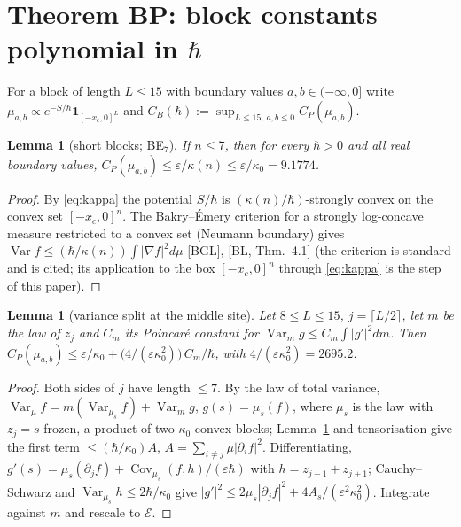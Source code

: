 \documentclass[11pt,a4paper]{article}
\newtheorem{lemma}[theorem]{Lemma}
\theoremstyle{definition}
\theoremstyle{remark}
\newcommand{\Var}{\operatorname{Var}}
\newcommand{\Cov}{\operatorname{Cov}}
\newcommand{\cE}{\mathcal{E}}
\newcommand{\xc}{x_c}
\begin{document}
\section{Theorem BP: block constants polynomial in \texorpdfstring{$\hbar$}{hbar}}\label{sec:BP}

For a block of length $L\le15$ with boundary values $a,b\in(-\infty,0]$ write $\mu_{a,b}\propto e^{-S/\hbar}\mathbf 1_{[-\xc,0]^L}$ and $C_B(\hbar):=\sup_{L\le15,\,a,b\le0}C_P(\mu_{a,b})$.

\begin{lemma}[short blocks; BE$_7$]\label{lem:BE7}
If $n\le7$, then for every $\hbar>0$ and all real boundary values, $C_P(\mu_{a,b})\le\varepsilon/\kappa(n)\le\varepsilon/\kappa_0=9.1774$.
\end{lemma}
\begin{proof}
By \eqref{eq:kappa} the potential $S/\hbar$ is $(\kappa(n)/\hbar)$-strongly convex on the convex set $[-\xc,0]^n$. The Bakry--\'Emery criterion for a strongly log-concave measure restricted to a convex set (Neumann boundary) gives $\Var f\le(\hbar/\kappa(n))\int|\nabla f|^2d\mu$ [BGL], [BL, Thm.~4.1] \textup{(}the criterion is standard and is cited; its application to the box $[-\xc,0]^n$ through \eqref{eq:kappa} is the step of this paper\textup{)}.
\end{proof}

\begin{lemma}[variance split at the middle site]\label{lem:split}
Let $8\le L\le15$, $j=\lceil L/2\rceil$, let $m$ be the law of $z_j$ and $C_m$ its Poincar\'e constant for $\Var_mg\le C_m\int|g'|^2dm$. Then $C_P(\mu_{a,b})\le\varepsilon/\kappa_0+\big(4/(\varepsilon\kappa_0^2)\big)\,C_m/\hbar$, with $4/(\varepsilon\kappa_0^2)=2695.2$.
\end{lemma}
\begin{proof}
Both sides of $j$ have length $\le7$. By the law of total variance, $\Var_\mu f=m(\Var_{\mu_s}f)+\Var_m g$, $g(s)=\mu_s(f)$, where $\mu_s$ is the law with $z_j=s$ frozen, a product of two $\kappa_0$-convex blocks; Lemma~\ref{lem:BE7} and tensorisation give the first term $\le(\hbar/\kappa_0)A$, $A=\sum_{i\ne j}\mu|\partial_if|^2$. Differentiating, $g'(s)=\mu_s(\partial_jf)+\Cov_{\mu_s}(f,h)/(\varepsilon\hbar)$ with $h=z_{j-1}+z_{j+1}$; Cauchy--Schwarz and $\Var_{\mu_s}h\le2\hbar/\kappa_0$ give $|g'|^2\le2\mu_s|\partial_jf|^2+4A_s/(\varepsilon^2\kappa_0^2)$. Integrate against $m$ and rescale to $\cE$.
\end{proof}
\end{document}
